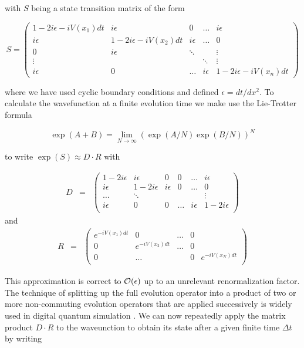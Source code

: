 with $S$ being a state transition matrix of the form

\begin{equation}
S = \left(
	\begin{array}{ccccc}
		1-2i\epsilon-iV(x_1)dt & i\epsilon & 0 & \hdots &  i\epsilon \\
		i \epsilon & 1-2i\epsilon -iV(x_2)dt & i\epsilon & \hdots & 0 \\
		0 & i\epsilon & \ddots & & \vdots \\
		\vdots & & & \ddots  & \vdots \\
		i \epsilon & 0 & \hdots & i\epsilon & 1 - 2i\epsilon -iV(x_n)dt
	\end{array}
 \right) \label{eq:grover_iteration_matrix}
\end{equation}

where we have used cyclic boundary conditions and defined $\epsilon = dt/dx^2$. To calculate the wavefunction at a finite evolution time we make use the Lie-Trotter formula

\begin{equation}
\exp{\left(A+B\right)} = \lim\limits_{N\to\infty}\left(\exp{\left(A/N\right)}\exp{\left(B/N\right)}\right)^N
\end{equation}

to write $\exp{\left(S\right)} \approx D\cdot R$ with 

\begin{eqnarray}
D & = & \left( 
		\begin{array}{cccccc}
		1-2i \epsilon & i\epsilon & 0 & 0 & \hdots & i\epsilon \\
		i \epsilon & 1 - 2i \epsilon & i \epsilon & 0 & \hdots & 0 \\
		\hdots & \ddots & & & & \vdots \\
		i \epsilon & 0 & 0 &  \hdots & i\epsilon & 1-2i \epsilon \\
		\end{array}
	\right)
\end{eqnarray}
and 
\begin{eqnarray}
R & = & \left( \begin{array}{ccccc}
	e^{-i V(x_1) dt} & 0 & \hdots & 0 \\
	0 & e^{-i V (x_2) dt} & \hdots & 0 \\
	0 & \hdots & & 0 & e^{-i V (x_N) dt} \\
	\end{array}
	\right)
\end{eqnarray}

This approximation is correct to $\begin{mathcal}O\end{mathcal}(\epsilon)$ up to an unrelevant renormalization factor. The technique of splitting up the full evolution operator into a product of two or more non-commuting evolution operators that are applied successively is widely used in digital quantum simulation \citep{lloyd_universal_1996,lanyon_universal_2011}. We can now repeatedly apply the matrix product $D\cdot R$ to the waveunction to obtain its state after a given finite time $\Delta t$ by writing

